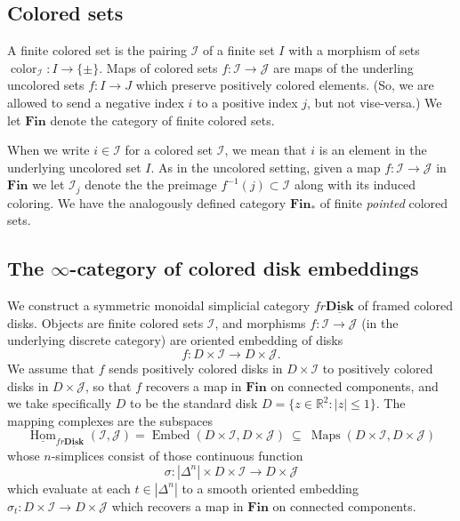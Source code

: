 \documentclass[reqno]{amsart}
\theoremstyle{definition}
\newcommand{\mbb}[1]{\mathbb{#1}}
\newcommand{\mcl}[1]{\mathcal{#1}}
\newcommand{\mbf}[1]{\mathbf{#1}}
\newcommand{\opn}[1]{\operatorname{#1}}
\newcommand{\uHom}{\underline{\operatorname{Hom}}}
\newcommand{\uDisk}{\underline{\mathbf{Disk}}}
\DeclareMathOperator{\Maps}{Maps}
\renewcommand{\1}{\mathbf{1}}
\begin{document}
\subsection{Colored sets}
\label{sect:col_sets}

A finite colored set is the pairing $\mcl{I}$ of a finite set $I$ with a morphism of sets $\opn{color}_{\mcl{I}}:I\to \{\pm\}$.  Maps of colored sets $f:\mcl{I}\to \mcl{J}$ are maps of the underling uncolored sets $f:I\to J$ which preserve positively colored elements.  (So, we are allowed to send a negative index $i$ to a positive index $j$, but not vise-versa.)  We let $\mbf{Fin}$ denote the category of finite colored sets.
\par

When we write $i\in \mcl{I}$ for a colored set $\mcl{I}$, we mean that $i$ is an element in the underlying uncolored set $I$. As in the uncolored setting, given a map $f:\mcl{I}\to \mcl{J}$ in $\mbf{Fin}$ we let $\mcl{I}_j$ denote the the preimage $f^{-1}(j)\subset \mcl{I}$ along with its induced coloring. We have the analogously defined category $\mbf{Fin}_{\ast}$ of finite \emph{pointed} colored sets.

\subsection{The $\infty$-category of colored disk embeddings}
\label{sect:colored_disks}

We construct a symmetric monoidal simplicial category $fr\uDisk$ of framed colored disks.  Objects are finite colored sets $\mcl{I}$, and morphisms $f:\mcl{I}\to \mcl{J}$ (in the underlying discrete category) are oriented embedding of disks
\begin{equation}\label{eq:1260}
f:D\times \mcl{I}\to D\times \mcl{J}.
\end{equation}
We assume that $f$ sends positively colored disks in $D\times \mcl{I}$ to positively colored disks in $D\times \mcl{J}$, so that $f$ recovers a map in $\mbf{Fin}$ on connected components, and we take specifically $D$ to be the standard disk $D=\{z\in \mbb{R}^2:|z|\leq 1\}$.  The mapping complexes are the subspaces
\[
\uHom_{fr\uDisk}(\mcl{I},\mcl{J})=\opn{Embed}(D\times \mcl{I},D\times \mcl{J})\ \subseteq\ \Maps(D\times \mcl{I},D\times \mcl{J})
\]
whose $n$-simplices consist of those continuous function
\[
\sigma:|\Delta^n|\times D\times \mcl{I}\to D\times \mcl{J}
\]
which evaluate at each $t\in |\Delta^n|$ to a smooth oriented embedding $\sigma_t:D\times \mcl{I}\to D\times \mcl{J}$ which recovers a map in $\mbf{Fin}$ on connected components.
\end{document}

